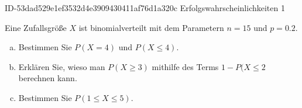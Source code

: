 \begin{exercise}
      {ID-53dad529e1ef3532d4e3909430411af76d1a320c}
      {Erfolgswahrscheinlichkeiten 1}
  \ifproblem\problem\par
    Eine Zufallsgröße $X$ ist binomialverteilt mit dem Parametern $n=15$ und
    $p=\num{0.2}$.
    \begin{enumerate}[a)]
      \item Bestimmen Sie $P(X=4)$ und $P(X\leq4)$.
      \item Erklären Sie, wieso man $P(X\geq3)$ mithilfe des Terms $1-P(X\leq2$
            berechnen kann.
      \item Bestimmen Sie $P(1\leq X\leq5)$.
    \end{enumerate}
  \fi
\end{exercise}
